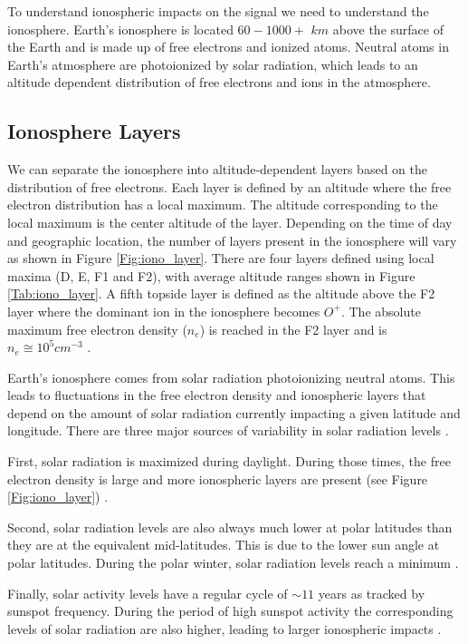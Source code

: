 To understand ionospheric impacts on the \cm signal we need to understand the ionosphere. Earth's ionosphere is located $60 - 1000+$ $km$ above the surface of the Earth and is made up of free electrons and ionized atoms. Neutral atoms in Earth's atmosphere are photoionized by solar radiation, which leads to an altitude dependent distribution of free electrons and ions in the atmosphere.


\subsection{Ionosphere Layers}

We can separate the ionosphere into altitude-dependent layers based on the distribution of free electrons. Each layer is defined by an altitude where the free electron distribution has a local maximum. The altitude corresponding to the local maximum is the center altitude of the layer. Depending on the time of day and geographic location, the number of layers present in the ionosphere will vary as shown in Figure \ref{Fig:iono_layer}. There are four layers defined using local maxima (D, E, F1 and F2), with average altitude ranges shown in Figure \ref{Tab:iono_layer}. A fifth topside layer is defined as the altitude above the F2 layer where the dominant ion in the ionosphere becomes $O^+$. The absolute maximum free electron density ($n_e$) is reached in the F2 layer and is $n_e \cong 10^5 cm^{-3}$ \cite{ionospheres}. 

Earth's ionosphere comes from solar radiation photoionizing neutral atoms. This leads to fluctuations in the free electron density and ionospheric layers that depend on the amount of solar radiation currently impacting a given latitude and longitude. There are three major sources of variability in solar radiation levels \cite{ionospheres}.

First, solar radiation is maximized during daylight. During those times, the free electron density is large and more ionospheric layers are present (see Figure \ref{Fig:iono_layer}) \cite{ionospheres}. 

Second, solar radiation levels are also always much lower at polar latitudes than they are at the equivalent mid-latitudes. This is due to the lower sun angle at polar latitudes. During the polar winter, solar radiation levels reach a minimum \cite{ionospheres}. 

Finally, solar activity levels have a regular cycle of $\sim 11$ years as tracked by sunspot frequency. During the period of high sunspot activity the corresponding levels of solar radiation are also higher, leading to larger ionospheric impacts \cite{ionospheres}. 



